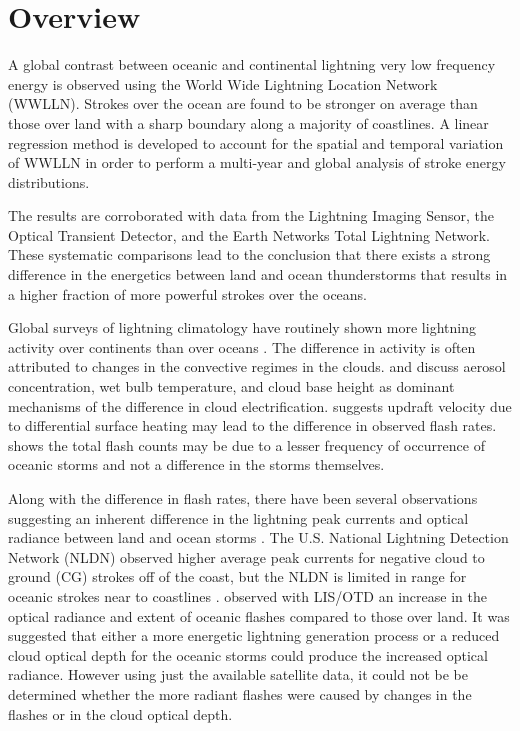 \section{Overview}

A global contrast between oceanic and continental lightning very low frequency energy is observed using the World Wide Lightning Location Network (WWLLN).
Strokes over the ocean are found to be stronger on average than those over land with a sharp boundary along a majority of coastlines.
A linear regression method is developed to account for the spatial and temporal variation of WWLLN in order to perform a multi-year and global analysis of stroke energy distributions.

The results are corroborated with data from the Lightning Imaging Sensor, the Optical Transient Detector, and the Earth Networks Total Lightning Network.
These systematic comparisons lead to the conclusion that there exists a strong difference in the energetics between land and ocean thunderstorms that results in a higher fraction of more powerful strokes over the oceans. 

Global surveys of lightning climatology have routinely shown more lightning activity over continents than over oceans \citep{Christian2003}.
The difference in activity is often attributed to changes in the convective regimes in the clouds.
\citet{Williams2002} and \citet{Williams2005} discuss aerosol concentration, wet bulb temperature, and cloud base height as dominant mechanisms of the difference in cloud electrification.
\citet{Zipser1994} suggests updraft velocity due to differential surface heating may lead to the difference in observed flash rates.
\citet{Boccippio2000} shows the total flash counts may be due to a lesser frequency of occurrence of oceanic storms and not a difference in the storms themselves.

Along with the difference in flash rates, there have been several observations suggesting an inherent difference in the lightning peak currents and optical radiance between land and ocean storms \citep{Seity2001, Ishii2010}. 
The U.S. National Lightning Detection Network (NLDN) observed higher average peak currents for negative cloud to ground (CG) strokes off of the coast, but the NLDN is limited in range for oceanic strokes near to coastlines \citep{Rudlosky2010, Lyons1998}.
\citet{Boccippio2000} observed with LIS/OTD an increase in the optical radiance and extent of oceanic flashes compared to those over land.
It was suggested that either a more energetic lightning generation process or a reduced cloud optical depth for the oceanic storms could produce the increased optical radiance.
However using just the available satellite data, it could not be be determined whether the more radiant flashes were caused by changes in the flashes or in the cloud optical depth.

